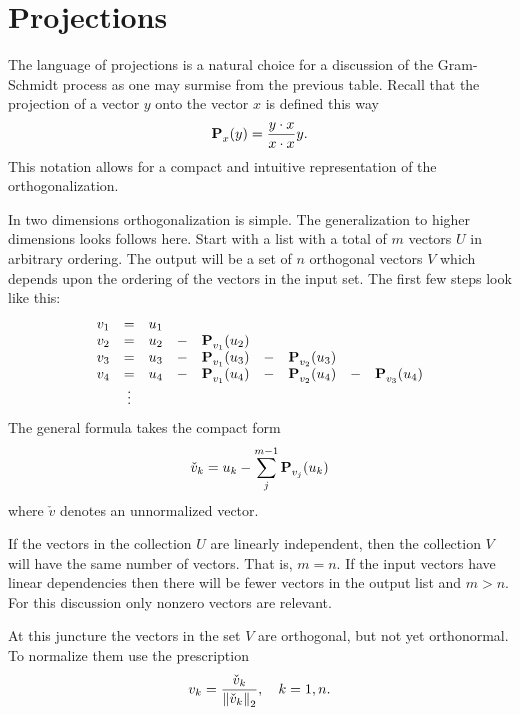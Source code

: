 \section{Projections}
The language of projections is a natural choice for a discussion of the Gram-Schmidt process as one may surmise from the previous table. Recall that the projection of a vector $y$ onto the vector $x$ is defined this way
\begin{equation}
  \textbf{P}^{\mathrm{}}_{x}(y) = \frac{y\cdot x}{x\cdot x}y.
\end{equation}
This notation allows for a compact and intuitive representation of the orthogonalization.

In two dimensions orthogonalization is simple. The generalization to higher dimensions looks follows here. Start with a list with a total of $m$ vectors $U$ in arbitrary ordering. The output will be a set of $n$ orthogonal vectors $V$ which depends upon the ordering of the vectors in the input set. The first few steps look like this:
\begin{equation}
  \begin{array}{cccccccccc}
    v_{1} &=& u_{1}\\
    v_{2} &=& u_{2} &-& \textbf{P}^{\mathrm{}}_{v_{1}}(u_{2})\\
    v_{3} &=& u_{3} &-& \textbf{P}^{\mathrm{}}_{v_{1}}(u_{3}) &-& \textbf{P}^{\mathrm{}}_{v_{2}}(u_{3})\\
    v_{4} &=& u_{4} &-& \textbf{P}^{\mathrm{}}_{v_{1}}(u_{4}) &-& \textbf{P}^{\mathrm{}}_{v_{2}}(u_{4}) &-& \textbf{P}^{\mathrm{}}_{v_{3}}(u_{4})\\
     & \vdots
  \end{array}
\end{equation}
The general formula takes the compact form
\begin{equation}
  \check{v}_{k} = u_{k} - \sum_{j}^{m-1}{\textbf{P}^{\mathrm{}}_{v_{j}}(u_{k})}
\end{equation}
where $\check{v}$ denotes an unnormalized vector.

If the vectors in the collection $U$ are linearly independent, then the collection $V$ will have the same number of vectors. That is, $m=n$. If the input vectors have linear dependencies then there will be fewer vectors in the output list and $m>n$. For this discussion only nonzero vectors are relevant.
 
At this juncture the vectors in the set $V$ are orthogonal, but not yet orthonormal. To normalize them use the prescription
\begin{equation}
  v_{k} = \frac{\check{v}_{k}}{\left\lVert\check{v}_{k}\right\rVert_{2}}, \quad k=1,n.
\end{equation}

